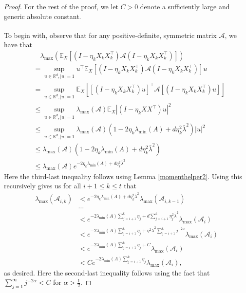 \documentclass[11pt, reqno,english]{amsart}
\begin{document}
\begin{proof}
For the rest of the proof, we let $C > 0$ denote a sufficiently large and generic absolute constant.
\\\\
To begin with, observe that for any positive-definite, symmetric matrix $\mathcal A$, we have that
\begin{align*}
& \quad \lambda_{\max}(\mathbb{E}_X[(I - \eta_kX_kX_k^\top) \mathcal A (I - \eta_k X_kX_k^\top)])
\\
&= \sup_{u \in \mathbb{R}^d, |u| = 1} u^\top\mathbb{E}_X[(I -  \eta_kX_kX_k^\top)\mathcal A(I - \eta_kX_kX_k^\top)] u 
\\
&= \sup_{u \in \mathbb{R}^d, |u| = 1} \mathbb{E}_X [[(I - \eta_kX_kX_k^\top)u]^\top \mathcal A [(I - \eta_kX_kX_k^\top)u]]
\\
&\leq \sup_{u \in \mathbb{R}^d, |u| = 1} \lambda_{\max}(\mathcal A) \mathbb{E}_X |(I - \eta_kXX^\top)u|^2
\\
&\leq \sup_{u \in \mathbb{R}^d, |u| = 1} \lambda_{\max}(\mathcal A)(1 - 2\eta_k \lambda_{\min}(A) + d\eta^2_k\bar{\lambda}^2)|u|^2
\\
&\leq  \lambda_{\max}(\mathcal A)(1 - 2\eta_k\lambda_{\min}(A) + d\eta^2_k\bar{\lambda}^2)
\\
&\leq \lambda_{\max}(\mathcal A) e^{-2\eta_k \lambda_{\min}(A) + d\eta^2_k\bar{\lambda}^2}
\end{align*}
Here the third-last inequality follows using Lemma \ref{momenthelper2}. Using this recursively gives us for all $i+1 \leq k \leq t$ that
\begin{align*}
\lambda_{\max}(\mathcal A_{i, k}) &< e^{-2\eta_{k}\lambda_{\min}(A) + d\eta^2_{k}\bar{\lambda}^2} \lambda_{\max}(\mathcal A_{i, k-1})
\\
&\dots
\\
&< e^{-2\lambda_{\min}(A)\sum_{j = i+1}^k\eta_j + d\sum_{j=i+1}^k \eta^2_{j}\bar{\lambda}^2}  \lambda_{\max}(\mathcal A_i)
\\
&< e^{-2\lambda_{\min}(A)\sum_{j = i+1}^k\eta_j + \eta^2\bar{\lambda}^2\sum_{j=i+1}^kj^{-2\alpha}}  \lambda_{\max}(\mathcal A_i)
\\
&< e^{-2\lambda_{\min}(A)\sum_{j = i+1}^k\eta_j + C} \lambda_{\max}(\mathcal A_i)
\\
&< Ce^{-2\lambda_{\min}(A)\sum_{j=i+1}^k\eta_j} \lambda_{\max}(\mathcal A_i),
\end{align*}
as desired. Here the second-last inequality follows using the fact that $\sum_{j = 1}^\infty j^{-2\alpha} < C$ for $\alpha > \frac{1}{2}$.  
\end{proof}
\end{document}
